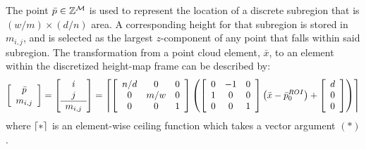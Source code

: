 			The point $\bar{p}\in{\Bbb Z}^{{\cal M}}$ is used to represent the location of a discrete subregion that is $(w/m) \times (d/n)$ area. A corresponding height for that subregion is stored in $m_{i,j}$, and is selected as the largest $z$-component of any point that falls within said subregion. The transformation from a point cloud element, $\bar{x}$, to an element within the discretized height-map frame can be described by:
				\begin{equation}
					\left[
						\begin{array}{c}
						\bar{p} \\
						m_{i,j}  	\\
						\end{array}
					\right]
					=
					\left[
						\begin{array}{c}
						i \\
						j \\ \hline
						m_{i,j}  	\\
						\end{array}
					\right]
					=
					\left\lceil
						\left[
							\begin{array}{ccc}
							n/d & 0 	& 0 \\
							0 	& m/w 	& 0 \\
							0 	& 0 	& 1 \\
							\end{array}
						\right]
						\left(
							\left[
								\begin{array}{ccc}
								0 &-1 & 0 \\
								1 & 0 & 0 \\
								0 & 0 & 1 \\
								\end{array}
							\right]
							\left(\bar{x}-\bar{p}_{0}^{ROI}\right)
							+
							\left[
								\begin{array}{c}
								d \\
								0 \\
								0 \\
								\end{array}
							\right]
						\right)
					\right\rceil
					\label{eq::toheightmapframe}
				\end{equation}
			where $\left\lceil*\right\rceil$ is an element-wise ceiling function which takes a vector argument $(*)$.

